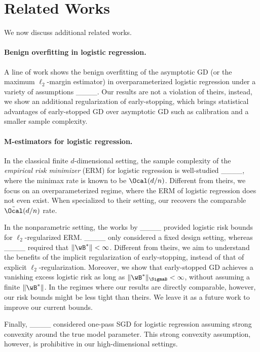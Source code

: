 \section{Related Works}
We now discuss additional related works.


\paragraph{Benign overfitting in logistic regression.} 
A line of work shows the benign overfitting of the asymptotic GD (or the maximum $\ell_2$-margin estimator) in overparameterized logistic regression under a variety of assumptions ____. 
Our results are not a violation of theirs, instead, we show an additional regularization of early-stopping, which brings statistical advantages of early-stopped GD over asymptotic GD such as calibration and a smaller sample complexity. 






\paragraph{M-estimators for logistic regression.}
In the classical finite $d$-dimensional setting, the sample complexity of the \emph{empirical risk minimizer} (ERM) for logistic regression is well-studied ____, where the minimax rate is known to be $\Ocal(d/n)$.
Different from theirs, we focus on an overparameterized regime, where the ERM of logistic regression does not even exist. When specialized to their setting, our  recovers the comparable $\tilde{\Ocal}(d/n)$ rate.

In the nonparametric setting, the works by ____ provided logistic risk bounds for $\ell_2$-regularized ERM. 
____ only considered a fixed design setting, whereas ____ required that $\|\wB^*\|<\infty$. 
Different from theirs, we aim to understand the benefits of the implicit regularization of early-stopping, instead of that of explicit $\ell_2$-regularization.
Moreover, we show that early-stopped GD achieves a vanishing excess logistic risk as long as $\|\wB^*\|_{\SigmaB}<\infty$, without assuming a finite $\|\wB^*\|$. In the regimes where our results are directly comparable, however, our risk bounds might be less tight than theirs. We leave it as a future work to improve our current bounds.

Finally, ____ considered one-pass SGD for logistic regression assuming strong convexity around the true model parameter.
This strong convexity assumption, however, is prohibitive in our high-dimensional settings. 



